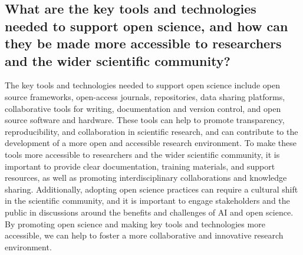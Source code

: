 \subsection{What are the key tools and technologies needed to support open science, and how can they be made more accessible to researchers and the wider scientific community?}
The key tools and technologies needed to support open science include open source frameworks, open-access journals, repositories, data sharing platforms, collaborative tools for writing, documentation and version control, and open source software and hardware. These tools can help to promote transparency, reproducibility, and collaboration in scientific research, and can contribute to the development of a more open and accessible research environment. To make these tools more accessible to researchers and the wider scientific community, it is important to provide clear documentation, training materials, and support resources, as well as promoting interdisciplinary collaborations and knowledge sharing. Additionally, adopting open science practices can require a cultural shift in the scientific community, and it is important to engage stakeholders and the public in discussions around the benefits and challenges of AI and open science. By promoting open science and making key tools and technologies more accessible, we can help to foster a more collaborative and innovative research environment.
    
